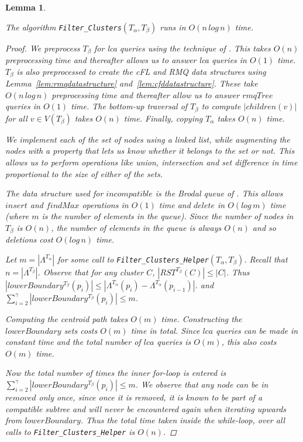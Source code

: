 \documentclass{article}
\newcommand{\leafset}{\Lambda}
\newcommand{\TA}{T_\alpha}
\newcommand{\TB}{T_\beta}
\newtheorem{filterclustersruntime}[incompatibility]{Lemma}
\begin{document}
    \bigskip
    \begin{filterclustersruntime}
        \label{lem:filterclustersruntime}

        The algorithm \texttt{Filter\_Clusters}$(\TA, \TB)$ runs in $O(n\,log\,n)$ time.

        \begin{proof}
            We preprocess $\TB$ for \textit{lca} queries using the technique of \cite{bender2000lca}. This takes $O(n)$ preprocessing time and thereafter allows us to answer \textit{lca} queries in $O(1)$ time. $\TB$ is also preprocessed to create the cFL and RMQ data structures using Lemma~\ref{lem:rmqdatastructure} and~\ref{lem:cfddatastructure}. These take $O(n\,log\,n)$ preprocessing time and thereafter allow us to answer $rmqTree$ queries in $O(1)$ time. The bottom-up traversal of $\TB$ to compute $|children(v)|$ for all $v \in V(\TB)$ takes $O(n)$ time. Finally, copying $\TA$ takes $O(n)$ time.

            We implement each of the set of nodes using a linked list, while augmenting the nodes with a property that lets us know whether it belongs to the set or not. This allows us to perform operations like union, intersection and set difference in time proportional to the size of either of the sets.

            The data structure used for $incompatible$ is the Brodal queue of \cite{brodal1995fast}. This allows $insert$ and $findMax$ operations in $O(1)$ time and $delete$ in $O(log\,m)$ time (where $m$ is the number of elements in the queue). Since the number of nodes in $\TB$ is $O(n)$, the number of elements in the queue is always $O(n)$ and so deletions cost $O(log\,n)$ time.

            Let $m = |\leafset^{\TA}|$ for some call to \texttt{Filter\_Clusters\_Helper}$(\TA, \TB)$. Recall that $n = |\leafset^{\TB}|$. Observe that for any cluster $C$, $|RST^{\TB}(C)| \leq |C|$. Thus $|lowerBoundary^{\TB}(p_i)| \leq |\leafset^{\TA}(p_i) - \leafset^{\TA}(p_{i-1})|$. and $\sum_{i = 2}^{\gamma} |lowerBoundary^{\TB}(p_i)| \leq m$.

            Computing the centroid path takes $O(m)$ time. Constructing the $lowerBoundary$ sets costs $O(m)$ time in total. Since $lca$ queries can be made in constant time and the total number of $lca$ queries is $O(m)$, this also costs $O(m)$ time.

            Now the total number of times the inner for-loop is entered is $\sum_{i = 2}^{\gamma} |lowerBoundary^{\TB}(p_i)| \leq m$. We observe that any node can be in $removed$ only once, since once it is removed, it is known to be part of a compatible subtree and will never be encountered again when iterating upwards from $lowerBoundary$. Thus the total time taken inside the while-loop, over all calls to \texttt{Filter\_Clusters\_Helper} is $O(n)$.


\end{proof}
\end{filterclustersruntime}
\end{document}
